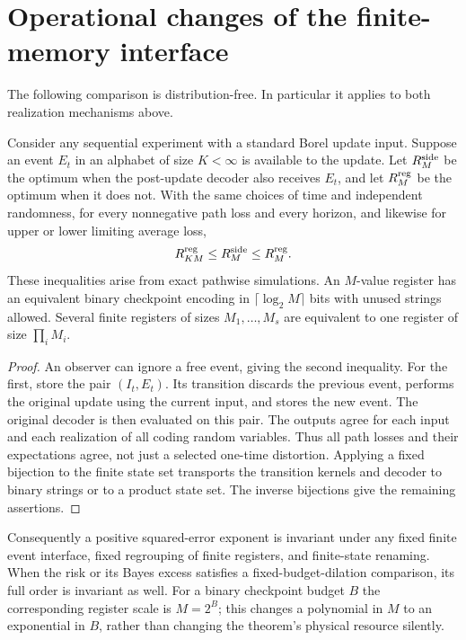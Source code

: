 \section{Operational changes of the finite-memory interface}
\label{sec:v6-operational}
The following comparison is distribution-free. In particular it applies
to both realization mechanisms above.

\begin{theorem}\label{thm:v6-interface}
Consider any sequential experiment with a standard Borel update input.
Suppose an event $E_t$ in an alphabet of size $K<\infty$ is available to
the update. Let $R_M^{\rm side}$ be the optimum when the post-update
decoder also receives $E_t$, and let $R_M^{\rm reg}$ be the optimum when
it does not. With the same choices of time and independent randomness,
for every nonnegative path loss and every horizon, and likewise for
upper or lower limiting average loss,
\begin{equation}
             R_{KM}^{\rm reg}\le R_M^{\rm side}\le R_M^{\rm reg}.
                                                        \label{eq:v6-interface}
\end{equation}
These inequalities arise from exact pathwise simulations.
An $M$-value register has an equivalent binary checkpoint encoding in
$\lceil\log_2M\rceil$ bits with unused strings allowed. Several finite
registers of sizes $M_1,\ldots,M_s$ are equivalent to one register of
size $\prod_iM_i$.
\end{theorem}
\begin{proof}
An observer can ignore a free event, giving the second inequality.
For the first, store the pair $(I_t,E_t)$. Its transition discards the
previous event, performs the original update using the current input,
and stores the new event. The original decoder is then evaluated on
this pair. The outputs agree for each input and each realization of
all coding random variables. Thus all path losses and their expectations
agree, not just a selected one-time distortion. Applying a fixed
bijection to the finite state set transports the transition kernels
and decoder to binary strings or to a product state set. The inverse
bijections give the remaining assertions.
\end{proof}

Consequently a positive squared-error exponent is invariant under any
fixed finite event interface, fixed regrouping of finite registers,
and finite-state renaming. When the risk or its Bayes excess satisfies
a fixed-budget-dilation comparison, its full order is invariant as
well. For a binary checkpoint budget $B$ the corresponding register
scale is $M=2^B$; this changes a polynomial in $M$ to an exponential
in $B$, rather than changing the theorem's physical resource silently.

